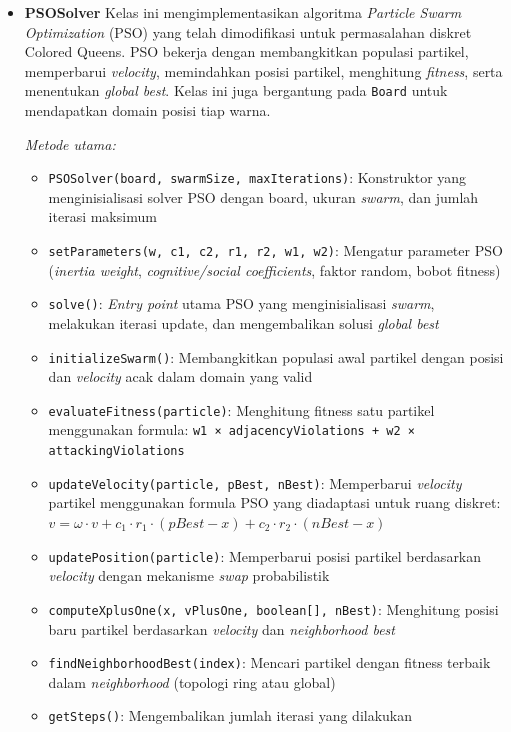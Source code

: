 \documentclass[a4paper,twoside]{article}
\begin{document}
\begin{itemize}
		\item \textbf{PSOSolver}  
		Kelas ini mengimplementasikan algoritma \textit{Particle Swarm Optimization} (PSO) yang telah dimodifikasi untuk permasalahan diskret Colored Queens. PSO bekerja dengan membangkitkan populasi partikel, memperbarui \textit{velocity}, memindahkan posisi partikel, menghitung \textit{fitness}, serta menentukan \textit{global best}. Kelas ini juga bergantung pada \texttt{Board} untuk mendapatkan domain posisi tiap warna.
		
		\textit{Metode utama:}
		\begin{itemize}
			\item \texttt{PSOSolver(board, swarmSize, maxIterations)}: Konstruktor yang menginisialisasi solver PSO dengan board, ukuran \textit{swarm}, dan jumlah iterasi maksimum
			\item \texttt{setParameters(w, c1, c2, r1, r2, w1, w2)}: Mengatur parameter PSO (\textit{inertia weight}, \textit{cognitive/social coefficients}, faktor random, bobot fitness)
			\item \texttt{solve()}: \textit{Entry point} utama PSO yang menginisialisasi \textit{swarm}, melakukan iterasi update, dan mengembalikan solusi \textit{global best}
			\item \texttt{initializeSwarm()}: Membangkitkan populasi awal partikel dengan posisi dan \textit{velocity} acak dalam domain yang valid
			\item \texttt{evaluateFitness(particle)}: Menghitung fitness satu partikel menggunakan formula: \texttt{w1 × adjacencyViolations + w2 × attackingViolations}
			\item \texttt{updateVelocity(particle, pBest, nBest)}: Memperbarui \textit{velocity} partikel menggunakan formula PSO yang diadaptasi untuk ruang diskret: $v = \omega \cdot v + c_1 \cdot r_1 \cdot (pBest - x) + c_2 \cdot r_2 \cdot (nBest - x)$
			\item \texttt{updatePosition(particle)}: Memperbarui posisi partikel berdasarkan \textit{velocity} dengan mekanisme \textit{swap} probabilistik
			\item \texttt{computeXplusOne(x, vPlusOne, boolean[], nBest)}: Menghitung posisi baru partikel berdasarkan \textit{velocity} dan \textit{neighborhood best}
			\item \texttt{findNeighborhoodBest(index)}: Mencari partikel dengan fitness terbaik dalam \textit{neighborhood} (topologi ring atau global)
			\item \texttt{getSteps()}: Mengembalikan jumlah iterasi yang dilakukan
		\end{itemize}
		

\end{itemize}
\end{document}
